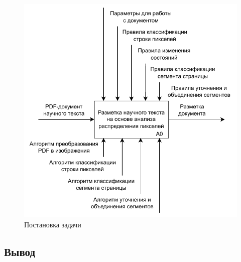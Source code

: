 \begin{figure}[H]
	\centering
	\includegraphics[width=\textwidth]{diag/a0.pdf}
	\caption{Постановка задачи}
	\label{fig:a0}
\end{figure}

\subsection*{Вывод}
